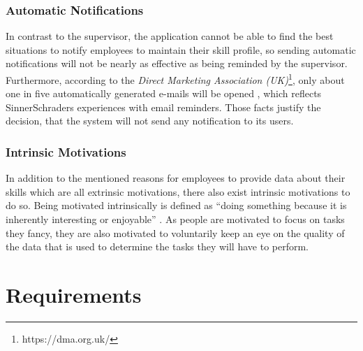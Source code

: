 \subsubsection{Automatic Notifications}
In contrast to the supervisor, the application cannot be able to find the best situations to notify employees to maintain their skill profile, so sending automatic notifications will not be nearly as effective as being reminded by the supervisor. Furthermore, according to the \textit{Direct Marketing Association (UK)}\footnote{https://dma.org.uk/}, only
about one in five automatically generated e-mails will be opened \cite{mailrep}, which reflects SinnerSchraders
experiences with email reminders. Those facts justify the decision, that the system will not send any notification to its users.

\newpage
\subsubsection{Intrinsic Motivations}
In addition to the mentioned reasons for employees to provide data about their skills which are all extrinsic motivations,
there also exist intrinsic motivations to do so. Being motivated intrinsically is defined as ``doing something because it is inherently interesting or enjoyable'' \cite{RYAN200054}. As people are motivated to focus on tasks they fancy, they are also motivated to voluntarily keep an eye on the quality of the data that is used to determine the tasks they will have to perform.


\section{Requirements}

\label{requirements}
